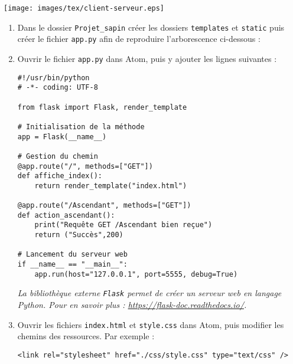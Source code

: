 \documentclass[a4paper]{article}
\begin{document}
\begin{center}
  \texttt{[image: images/tex/client-serveur.eps]}
\end{center} 

\activite
\begin{enumerate}
  \item Dans le dossier \verb|Projet_sapin| créer les dossiers \verb|templates| et \verb|static| puis créer le fichier \verb|app.py| afin de reproduire l'arborescence ci-dessous : 

    \begin{center}
    \end{center}
  \item Ouvrir le fichier \verb|app.py| dans Atom, puis y ajouter les lignes suivantes : 

	\begin{verbatim}
#!/usr/bin/python
# -*- coding: UTF-8

from flask import Flask, render_template

# Initialisation de la méthode
app = Flask(__name__)

# Gestion du chemin
@app.route("/", methods=["GET"])
def affiche_index():
    return render_template("index.html")

@app.route("/Ascendant", methods=["GET"])
def action_ascendant():
    print("Requête GET /Ascendant bien reçue")
    return ("Succès",200)

# Lancement du serveur web
if __name__ == "__main__":
    app.run(host="127.0.0.1", port=5555, debug=True)
	\end{verbatim}

    {\itshape La bibliothèque externe \verb|Flask| permet de créer un serveur web en langage Python. Pour en savoir plus : \url{https://flask-doc.readthedocs.io/}.}
  \item Ouvrir les fichiers \verb|index.html| et \verb|style.css| dans Atom, puis modifier les chemins des ressources. Par exemple :  

	\begin{verbatim}
<link rel="stylesheet" href="./css/style.css" type="text/css" />
	\end{verbatim}


\end{enumerate}
\end{document}
